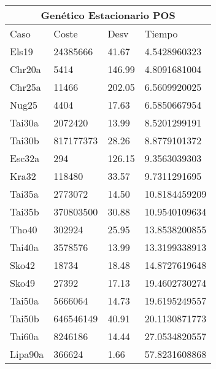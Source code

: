 \documentclass[twoside]{article}
\begin{document}
\begin{table}[h]
\centering
    \begin{tabular}{llll}
    \hline
    \multicolumn{4}{c}{Genético Estacionario POS} \\
    \toprule
    Caso               & Coste & Desv & Tiempo \\
    \midrule
    Els19&24385666&41.67&4.5428960323\\
    Chr20a&5414&146.99&4.8091681004\\
    Chr25a&11466&202.05&6.5609920025\\
    Nug25&4404&17.63&6.5850667954\\
    Tai30a&2072420&13.99&8.5201299191\\
    Tai30b&817177373&28.26&8.8779101372\\
    Esc32a&294&126.15&9.3563039303\\
    Kra32&118480&33.57&9.7311291695\\
    Tai35a&2773072&14.50&10.8184459209\\
    Tai35b&370803500&30.88&10.9540109634\\
    Tho40&302924&25.95&13.8538200855\\
    Tai40a&3578576&13.99&13.3199338913\\
    Sko42&18734&18.48&14.8727619648\\
    Sko49&27392&17.13&19.4602730274\\
    Tai50a&5666064&14.73&19.6195249557\\
    Tai50b&646546149&40.91&20.1130871773\\
    Tai60a&8246186&14.44&27.0534820557\\
    Lipa90a&366624&1.66&57.8231608868\\
    \bottomrule
    \end{tabular}
    \caption{}
\end{table}
\end{document}
